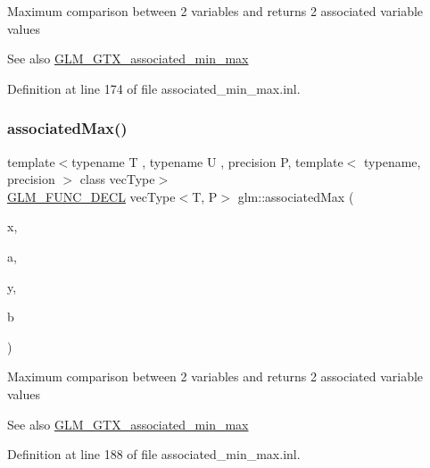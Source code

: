 Maximum comparison between 2 variables and returns 2 associated variable values \begin{DoxySeeAlso}{See also}
\mbox{\hyperlink{group__gtx__associated__min__max}{G\+L\+M\+\_\+\+G\+T\+X\+\_\+associated\+\_\+min\+\_\+max}} 
\end{DoxySeeAlso}


Definition at line 174 of file associated\+\_\+min\+\_\+max.\+inl.

\mbox{\label{group__gtx__associated__min__max_ga62ca63cca6b21387b8a25474f441a869}} 
\subsubsection{\texorpdfstring{associatedMax()}{associatedMax()}\hspace{0.1cm}{\footnotesize\ttfamily [3/12]}}
{\footnotesize\ttfamily template$<$typename T , typename U , precision P, template$<$ typename, precision $>$ class vec\+Type$>$ \\
\mbox{\hyperlink{setup_8hpp_ab2d052de21a70539923e9bcbf6e83a51}{G\+L\+M\+\_\+\+F\+U\+N\+C\+\_\+\+D\+E\+CL}} vec\+Type$<$T, P$>$ glm\+::associated\+Max (\begin{DoxyParamCaption}\item[{T}]{x,  }\item[{vec\+Type$<$ U, P $>$ const \&}]{a,  }\item[{T}]{y,  }\item[{vec\+Type$<$ U, P $>$ const \&}]{b }\end{DoxyParamCaption})}

Maximum comparison between 2 variables and returns 2 associated variable values \begin{DoxySeeAlso}{See also}
\mbox{\hyperlink{group__gtx__associated__min__max}{G\+L\+M\+\_\+\+G\+T\+X\+\_\+associated\+\_\+min\+\_\+max}} 
\end{DoxySeeAlso}


Definition at line 188 of file associated\+\_\+min\+\_\+max.\+inl.

\mbox{\label{group__gtx__associated__min__max_ga5364520173815b66a9d9e452c38bf312}} 
